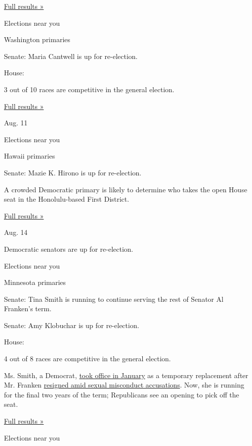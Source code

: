 \href{https://www.nytimes3xbfgragh.onion/interactive/2018/08/07/us/elections/results-missouri-primary-elections.html}{Full
results »}

Elections near you

Washington primaries

Senate: Maria Cantwell is up for re-election.

House:

3 out of 10 races are competitive in the general election.

\href{https://www.nytimes3xbfgragh.onion/interactive/2018/08/07/us/elections/results-washington-primary-elections.html}{Full
results »}

Aug. 11

Elections near you

Hawaii primaries

Senate: Mazie K. Hirono is up for re-election.

A crowded Democratic primary is likely to determine who takes the open
House seat in the Honolulu-based First District.

\href{https://www.nytimes3xbfgragh.onion/interactive/2018/08/11/us/elections/results-hawaii-primary-elections.html}{Full
results »}

Aug. 14

Democratic senators are up for re-election.

Elections near you

Minnesota primaries

Senate: Tina Smith is running to continue serving the rest of Senator Al
Franken's term.

Senate: Amy Klobuchar is up for re-election.

House:

4 out of 8 races are competitive in the general election.

Ms. Smith, a Democrat,
\href{https://www.nytimes3xbfgragh.onion/2017/12/13/us/tina-smith-minnesota-senate.html}{took
office in January} as a temporary replacement after Mr. Franken
\href{https://www.nytimes3xbfgragh.onion/2017/12/07/us/politics/al-franken-senate-sexual-harassment.html}{resigned
amid sexual misconduct accusations}. Now, she is running for the final
two years of the term; Republicans see an opening to pick off the seat.

\href{https://www.nytimes3xbfgragh.onion/interactive/2018/08/14/us/elections/results-minnesota-primary-elections.html}{Full
results »}

Elections near you

